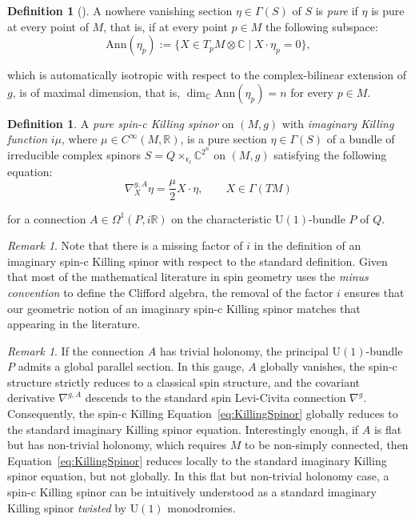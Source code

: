 \documentclass[10pt,a4paper,twoside,reqno]{amsart}
\theoremstyle{plain}
\theoremstyle{definition}
\newtheorem{definition}[thm]{Definition}
\theoremstyle{remark}
\newtheorem{remark}[thm]{Remark}
\def\C{\mathbb{C}}
\def\R{\mathbb{R}}
\def\U{\mathrm{U}}
\def\R{\mathbb{R}}
\begin{document}
\begin{definition}[{\cite[Chap.~IV, Sec.~9]{Spin89}}]
A nowhere vanishing section $\eta\in\Gamma(S)$ of $S$ is \emph{pure} if $\eta$ is pure at every point of $M$, that is, if at every point $p\in M$ the following subspace:
\begin{equation*}
\mathrm{Ann}(\eta_p):=\{X\in T_pM\otimes\C\mid X\cdot\eta_p=0\},
\end{equation*}

\noindent
which is automatically isotropic with respect to the complex-bilinear extension of $g$, is of maximal dimension, that is, $\dim_\C\mathrm{Ann}(\eta_p)=n$ for every $p\in M$.
\end{definition}

\begin{definition} 
A \emph{pure spin-c Killing spinor} on $(M,g)$ with \emph{imaginary Killing function} $i\mu$, where $\mu \in C^{\infty}(M,\mathbb{R})$, is a pure section $\eta\in \Gamma(S)$ of a bundle of irreducible complex spinors $S = Q \times_{\mathfrak{r}_{\ell}} \C^{2^n}$ on $(M,g)$ satisfying the following equation:
\begin{equation}
\label{eq:KillingSpinor}
\nabla^{g,A}_X \eta = \frac{\mu}{2} X\cdot \eta, \qquad X \in \Gamma(TM)
\end{equation}

\noindent
for a connection $A\in\Omega^1(P,i\R)$ on the characteristic $\U(1)$-bundle $P$ of $Q$.
\end{definition}

\begin{remark}
\label{remark:Convention}
Note that there is a missing factor of $i$ in the definition of an imaginary spin-c Killing spinor with respect to the standard definition. Given that most of the mathematical literature in spin geometry uses the \emph{minus convention} to define the Clifford algebra, the removal of the factor $i$ ensures that our geometric notion of an imaginary spin-c Killing spinor matches that appearing in the literature.
\end{remark}

\begin{remark}
If the connection $A$ has trivial holonomy, the principal $\mathrm{U}(1)$-bundle $P$ admits a global parallel section. In this gauge, $A$ globally vanishes, the spin-c structure strictly reduces to a classical spin structure, and the covariant derivative $\nabla^{g,A}$ descends to the standard spin Levi-Civita connection $\nabla^g$. Consequently, the spin-c Killing Equation~\eqref{eq:KillingSpinor} globally reduces to the standard imaginary Killing spinor equation. Interestingly enough, if $A$ is flat but has non-trivial holonomy, which requires $M$ to be non-simply connected, then Equation~\eqref{eq:KillingSpinor} reduces locally to the standard imaginary Killing spinor equation, but not globally. In this flat but non-trivial holonomy case, a spin-c Killing spinor can be intuitively understood as a standard imaginary Killing spinor \emph{twisted} by $\mathrm{U}(1)$ monodromies.
\end{remark}
\end{document}
